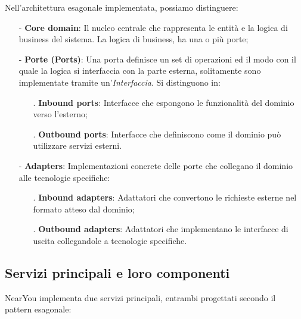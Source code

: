 \documentclass[10pt]{article}
\begin{document}
    Nell'architettura esagonale implementata, possiamo distinguere:
    \begin{itemize}
        \item[-] \textbf{Core domain}: Il nucleo centrale che rappresenta le entità e la logica di business del sistema. La logica di business, ha una o più porte;
        \item[-] \textbf{Porte (Ports)}: Una porta definisce un set di operazioni ed il modo con il quale la logica si interfaccia con la parte esterna, solitamente sono implementate tramite un'\textit{Interfaccia}. Si distinguono in:
        \begin{itemize}
            \item[.] \textbf{Inbound ports}: Interfacce che espongono le funzionalità del dominio verso l'esterno;
            \item[.] \textbf{Outbound ports}: Interfacce che definiscono come il dominio può utilizzare servizi esterni.
        \end{itemize}
        \item[-] \textbf{Adapters}: Implementazioni concrete delle porte che collegano il dominio alle tecnologie specifiche:
        \begin{itemize}
            \item[.] \textbf{Inbound adapters}: Adattatori che convertono le richieste esterne nel formato atteso dal dominio;
            \item[.] \textbf{Outbound adapters}: Adattatori che implementano le interfacce di uscita collegandole a tecnologie specifiche.
        \end{itemize}
    \end{itemize}

    \subsection{Servizi principali e loro componenti}

    NearYou implementa due servizi principali, entrambi progettati secondo il pattern esagonale:
\end{document}
